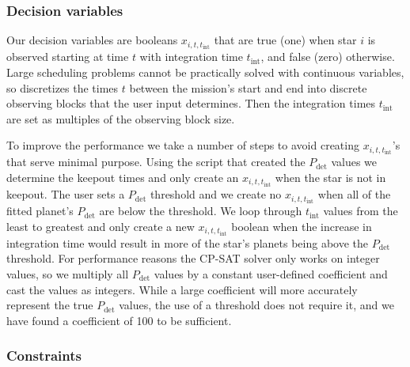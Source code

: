 




\subsubsection{Decision variables}

Our decision variables are booleans $x_{i,
t, t_{\textrm{int}}}$ that are true (one) when star $i$ is observed starting at
time $t$ with integration time $t_{\textrm{int}}$, and false (zero) otherwise.
Large scheduling problems cannot be practically solved with continuous
variables, so  discretizes the times $t$ between the mission's start
and end into discrete observing blocks that the user input determines. Then the
integration times $t_{\textrm{int}}$ are set as multiples of the observing
block size. 

To improve the performance we take a number of steps to avoid creating $x_{i,
t, t_{\textrm{int}}}$'s that serve minimal purpose. Using the  script
that created the $P_{\textrm{det}}$ values we determine the keepout times and
only create an $x_{i, t, t_{\textrm{int}}}$ when the star is not in keepout.
The user sets a $P_{\textrm{det}}$ threshold and we create no $x_{i, t,
t_{\textrm{int}}}$ when all of the fitted planet's $P_{\textrm{det}}$ are below
the threshold. We loop through $t_{\textrm{int}}$ values from the least
to greatest and only create a new $x_{i, t, t_{\textrm{int}}}$ boolean when the
increase in integration time would result in more of the star's planets being above
the $P_{\textrm{det}}$ threshold. For performance reasons the CP-SAT solver
only works on integer values, so we multiply all $P_{\textrm{det}}$ values by a
constant user-defined coefficient and cast the values as integers. While a
large coefficient will more accurately represent the true $P_{\textrm{det}}$
values, the use of a threshold does not require it, and we have found a
coefficient of 100 to be sufficient.

\subsubsection{Constraints}

